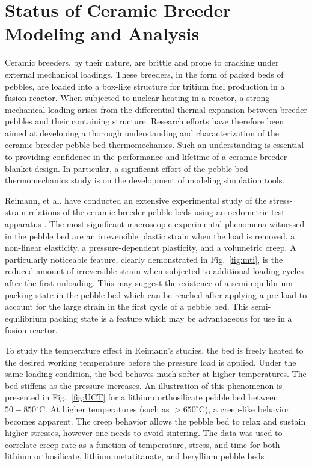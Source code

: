 \chapter{Status of Ceramic Breeder Modeling and Analysis}

Ceramic breeders, by their nature, are brittle and prone to cracking under external mechanical loadings. These breeders, in the form of packed beds of pebbles, are loaded into a box-like structure for tritium fuel production in a fusion reactor. When subjected to nuclear heating in a reactor, a strong mechanical loading arises from the differential thermal expansion between breeder pebbles and their containing structure. Research efforts have therefore been aimed at developing a thorough understanding and characterization of the ceramic breeder pebble bed thermomechanics. Such an understanding is essential to providing confidence in the performance and lifetime of a ceramic breeder blanket design. In particular, a significant effort of the pebble bed thermomechanics study is on the development of modeling simulation tools. 

Reimann, et al. have conducted an extensive experimental study of the stress-strain relations of the ceramic breeder pebble beds using an oedometric test apparatus \cite{Piazza2002811,Reimann:2002kl,Reimann:2003qc,Reimann:2002mi,Reimann:2001il}. The most significant macroscopic experimental phenomena witnessed in the pebble bed are an irreversible plastic strain when the load is removed, a non-linear elasticity, a pressure-dependent plasticity, and a volumetric creep.  A particularly noticeable feature, clearly demonstrated in Fig.~\ref{fig:mti}, is the reduced amount of irreversible strain when subjected to additional loading cycles after the first unloading. This may suggest the existence of a semi-equilibrium packing state in the pebble bed which can be reached after applying a pre-load to account for the large strain in the first cycle of a pebble bed. This semi-equilibrium packing state is a feature which may be advantageous for use in a fusion reactor. 

To study the temperature effect in Reimann's studies, the bed is freely heated to the desired working temperature before the pressure load is applied. Under the same loading condition, the bed behaves much softer at higher temperatures. The bed stiffens as the pressure increases. An illustration of this phenomenon is presented in Fig.~\ref{fig:UCT} for a lithium orthosilicate pebble bed between $50-850^\circ$C. At higher temperatures (such as $> 650^\circ$C), a creep-like behavior becomes apparent. The creep behavior allows the pebble bed to relax and sustain higher stresses, however one needs to avoid sintering. The data was used to correlate creep rate as a function of temperature, stress, and time for both lithium orthosilicate, lithium metatitanate, and beryllium pebble beds \cite{Buhler:2002qf,Reimann:2001il,Reimann:2005qa}.


